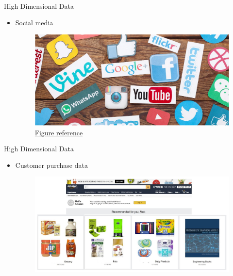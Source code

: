 \documentclass[serif, aspectratio=169]{beamer}
\begin{document}
\begin{frame}{High Dimensional Data}
    \begin{itemize}
        \item Social media
        \hspace{0.5}
        \begin{figure}[htpb]
            \begin{center}
      \includegraphics[keepaspectratio, scale=0.4]{pic/social.png}
             \caption{\href{https://redeemedlifecounseling.com/why-we-share-everything-on-social-media/}{Figure reference}}
            \end{center}
        \end{figure}
    \end{itemize}
\end{frame}

\begin{frame}{High Dimensional Data}
    \begin{itemize}
        \item Customer purchase data
        \begin{figure}[htpb]
            \begin{center}
                \includegraphics[keepaspectratio, scale=0.4]{pic/customer_data.JPG}
            \end{center}
        \end{figure}
    \end{itemize}
\end{frame}
\end{document}
